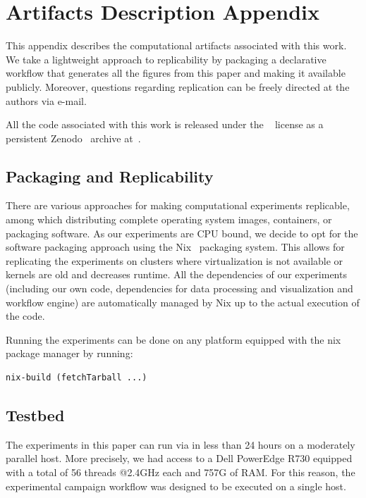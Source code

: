 \documentclass[sigconf]{acmart}
\begin{document}



\clearpage

\section*{Artifacts Description Appendix}

This appendix describes the computational artifacts associated with this work. We
take a lightweight approach to replicability by packaging a declarative
workflow that generates all the figures from this paper and making it available
publicly. Moreover, questions regarding replication can be freely directed at
the authors via e-mail.

All the code associated with this work is released under the ~\cite{ISC}
license as a persistent Zenodo~\cite{zenodo} archive at~\cite{zenodomain}.

\subsection{Packaging and Replicability}

There are various approaches for making computational experiments replicable,
among which distributing complete operating system images, containers, or
packaging software. As our experiments are CPU bound, we decide to opt for the
software packaging approach using the Nix~\cite{nix} packaging system. This
allows for replicating the experiments on clusters where virtualization is not
available or kernels are old and decreases runtime. All the dependencies of our
experiments (including our own code, dependencies for data processing and
visualization and workflow engine) are automatically managed by Nix up to the
actual execution of the code.

Running the experiments can be done on any platform equipped with the nix
package manager by running:

\begin{lstlisting}
nix-build (fetchTarball ...)
\end{lstlisting}

\subsection{Testbed}

 The experiments in this paper can run via in less than 24 hours on a moderately parallel
 host. More precisely, we had access to a Dell PowerEdge R730 equipped with
 a total of 56 threads @2.4GHz each and 757G of RAM. For this reason, the
 experimental campaign workflow was designed to be executed on a single host.
\end{document}
